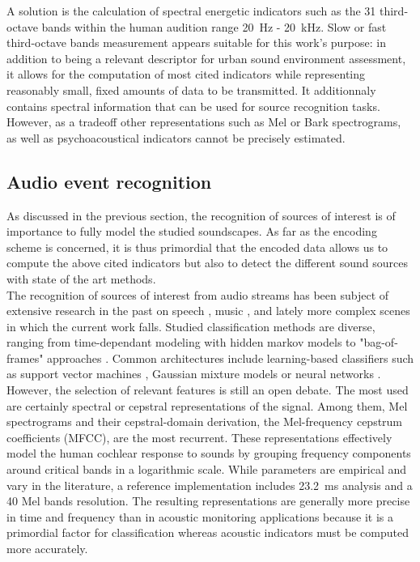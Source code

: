 \documentclass[12pt,times,onecolumn]{article}
\begin{document}
A solution is the calculation of spectral energetic indicators such as the 31 third-octave bands within the human audition range 20~Hz - 20~kHz. Slow or fast third-octave bands measurement appears suitable for this work's purpose: in addition to being a relevant descriptor \cite{torija2013} for urban sound environment assessment, it allows for the computation of most cited indicators while representing reasonably small, fixed amounts of data to be transmitted. It additionnaly contains spectral information that can be used for source recognition tasks. However, as a tradeoff other representations such as Mel or Bark spectrograms, as well as psychoacoustical indicators cannot be precisely estimated.

\subsection{Audio event recognition}

As discussed in the previous section, the recognition of sources of interest is of importance to fully model the studied soundscapes. As far as the encoding scheme is concerned, it is thus primordial that the encoded data allows us to compute the above cited indicators but also to detect the different sound sources with state of the art methods.\\

The recognition of sources of interest from audio streams has been subject of extensive research in the past on speech \cite{anusuya2009}, music \cite{tzanetakis2002}, and lately more complex scenes in which the current work falls. Studied classification methods are diverse, ranging from time-dependant modeling with hidden markov models \cite{ntalampiras2014} to "bag-of-frames" approaches \cite{aucouturier2007, foggia2015}. Common architectures include learning-based classifiers such as support vector machines \cite{kumar2016}, Gaussian mixture models \cite{radhakrishnan2005} or neural networks \cite{salamon2017, piczak2015}. However, the selection of relevant features is still an open debate. The most used are certainly spectral \cite{khunarsal2013} or cepstral \cite{couvreur2004} representations of the signal. Among them, Mel spectrograms and their cepstral-domain derivation, the Mel-frequency cepstrum coefficients (MFCC), are the most recurrent. These representations effectively model the human cochlear response to sounds by grouping frequency components around critical bands in a logarithmic scale. While parameters are empirical and vary in the literature, a reference implementation includes 23.2~ms analysis and a 40 Mel bands resolution. The resulting representations are generally more precise in time and frequency than in acoustic monitoring applications because it is a primordial factor for classification whereas acoustic indicators must be computed more accurately.\\
\end{document}
